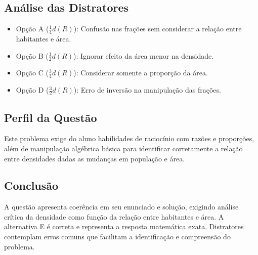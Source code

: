 \documentclass{article}
\begin{document}
\subsection*{Análise das Distratores}

\begin{itemize}
  \item Opção A ($\frac{1}{4} d(R)$): Confusão nas frações sem considerar a relação entre habitantes e área.
  \item Opção B ($\frac{1}{2} d(R)$): Ignorar efeito da área menor na densidade.
  \item Opção C ($\frac{3}{4} d(R)$): Considerar somente a proporção da área.
  \item Opção D ($\frac{3}{2} d(R)$): Erro de inversão na manipulação das frações.
\end{itemize}

\subsection*{Perfil da Questão}

Este problema exige do aluno habilidades de raciocínio com razões e proporções, além de manipulação algébrica básica para identificar corretamente a relação entre densidades dadas as mudanças em população e área.

\subsection*{Conclusão}

A questão apresenta coerência em seu enunciado e solução, exigindo análise crítica da densidade como função da relação entre habitantes e área. A alternativa E é correta e representa a resposta matemática exata. Distratores contemplam erros comuns que facilitam a identificação e compreensão do problema.
\end{document}
